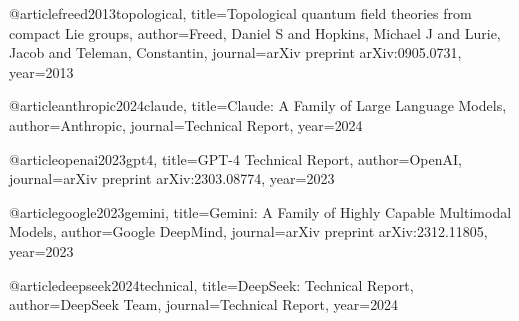 @article{freed2013topological,
  title={Topological quantum field theories from compact {L}ie groups},
  author={Freed, Daniel S and Hopkins, Michael J and Lurie, Jacob and Teleman, Constantin},
  journal={arXiv preprint arXiv:0905.0731},
  year={2013}
}

@article{anthropic2024claude,
  title={Claude: A Family of Large Language Models},
  author={{Anthropic}},
  journal={Technical Report},
  year={2024}
}

@article{openai2023gpt4,
  title={{GPT-4} Technical Report},
  author={{OpenAI}},
  journal={arXiv preprint arXiv:2303.08774},
  year={2023}
}

@article{google2023gemini,
  title={Gemini: A Family of Highly Capable Multimodal Models},
  author={{Google DeepMind}},
  journal={arXiv preprint arXiv:2312.11805},
  year={2023}
}

@article{deepseek2024technical,
  title={DeepSeek: Technical Report},
  author={{DeepSeek Team}},
  journal={Technical Report},
  year={2024}
}